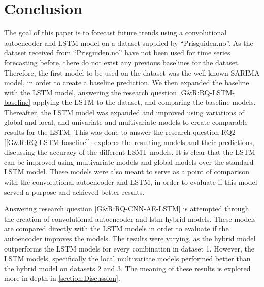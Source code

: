 \section{Conclusion}
\label{section:Discussion:Conclusion}



The goal of this paper is to forecast future trends using a convolutional autoencoder and LSTM model
on a dataset supplied by ``Prisguiden.no''.
As the dataset received from ``Prisguiden.no'' have not been used for time series forecasting before,
there do not exist any previous baselines for the dataset.
Therefore, the first model to be used on the dataset was the well known SARIMA model,
in order to create a baseline prediction.
We then expanded the baseline with the LSTM model, answering the research question \cref{G&R:RQ-LSTM-baseline}
applying the LSTM to the dataset, and comparing the baseline models.
Thereafter, the LSTM model was expanded and improved using variations of global and local, and univariate and multivariate models
to create comparable results for the LSTM.
This was done to answer the research question RQ2 [\ref{G&R:RQ-LSTM-baseline}].
 explores the resulting models and their predictions, discussing the accuracy of the different LSMT models.
It is clear that the LSTM can be improved using multivariate models and global models over the standard LSTM model.
These models were also meant to serve as a point of comparison with the convolutional autoencoder and LSTM,
in order to evaluate if this model served a purpose and achieved better results.

Answering research question \cref{G&R:RQ-CNN-AE-LSTM} is attempted through the creation of convolutional autoencoder and lstm hybrid models.
These models are compared directly with the LSTM models in order to evaluate if the autoencoder improves the models.
The results were varying, as the hybrid model outperforms the LSTM models for every combination in dataset 1.
However, the LSTM models, specifically the local multivariate models performed better than the hybrid model on datasets 2 and 3.
The meaning of these results is explored more in depth in \cref{section:Discussion}.

